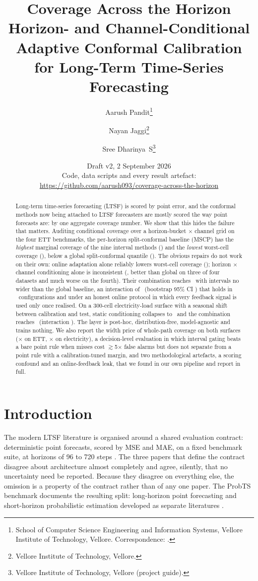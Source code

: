\documentclass[11pt]{article}
\title{\textbf{Coverage Across the Horizon}\\[2pt]
\large Horizon- and Channel-Conditional Adaptive Conformal Calibration\\for Long-Term Time-Series Forecasting}
\author{Aarush Pandit\thanks{School of Computer Science Engineering and Information Systems, Vellore Institute of Technology, Vellore. Correspondence: \todo{institutional email}.}
\and Nayan Jaggi\thanks{Vellore Institute of Technology, Vellore.}
\and Sree Dharinya~S\thanks{Vellore Institute of Technology, Vellore (project guide).}}
\date{Draft v2, 2 September 2026\\[2pt]
\small Code, data scripts and every result artefact: \url{https://github.com/aarush093/coverage-across-the-horizon}}
\begin{document}
\maketitle

\begin{abstract}
Long-term time-series forecasting (LTSF) is scored by point error, and the conformal methods now being attached to LTSF forecasters are mostly scored the way point forecasts are: by one aggregate coverage number. We show that this hides the failure that matters. Auditing conditional coverage over a horizon-bucket $\times$ channel grid on the four ETT benchmarks, the per-horizon split-conformal baseline (MSCP) has the \emph{highest} marginal coverage of the nine interval methods (\ettMSCPMarg) and the \emph{lowest} worst-cell coverage (\ettMSCPWorst), below a global split-conformal quantile (\ettGlobalWorst). The obvious repairs do not work on their own: online adaptation alone reliably lowers worst-cell coverage (\ettACIdWorst); horizon $\times$ channel conditioning alone is inconsistent (\ettCondWorst, better than global on three of four datasets and much worse on the fourth). Their combination reaches \ettPropDWorst\ with intervals no wider than the global baseline, an interaction of \ettInteractionD\ (bootstrap 95\% CI \ettInteractionCID) that holds in \ettPropDWinsG\ configurations and under an honest online protocol in which every feedback signal is used only once realised. On a 300-cell electricity-load surface with a seasonal shift between calibration and test, static conditioning collapses to \eclCondWorst\ and the combination reaches \eclPropDWorst\ (interaction \eclInteractionD). The layer is post-hoc, distribution-free, model-agnostic and trains nothing. We also report the width price of whole-path coverage on both surfaces (\ettMaxScoreRatio$\times$ on ETT, \eclMaxScoreRatio$\times$ on electricity), a decision-level evaluation in which interval gating beats a bare point rule when misses cost $\gtrsim$5$\times$ false alarms but does not separate from a point rule with a calibration-tuned margin, and two methodological artefacts, a scoring confound and an online-feedback leak, that we found in our own pipeline and report in full.
\end{abstract}

\section{Introduction}

The modern LTSF literature is organised around a shared evaluation contract: deterministic point forecasts, scored by MSE and MAE, on a fixed benchmark suite, at horizons of 96 to 720 steps \citep{informer,dlinear,patchtst}. The three papers that define the contract disagree about architecture almost completely and agree, silently, that no uncertainty need be reported. Because they disagree on everything else, the omission is a property of the contract rather than of any one paper. The ProbTS benchmark documents the resulting split: long-horizon point forecasting and short-horizon probabilistic estimation developed as separate literatures \citep{probts}.
\end{document}

